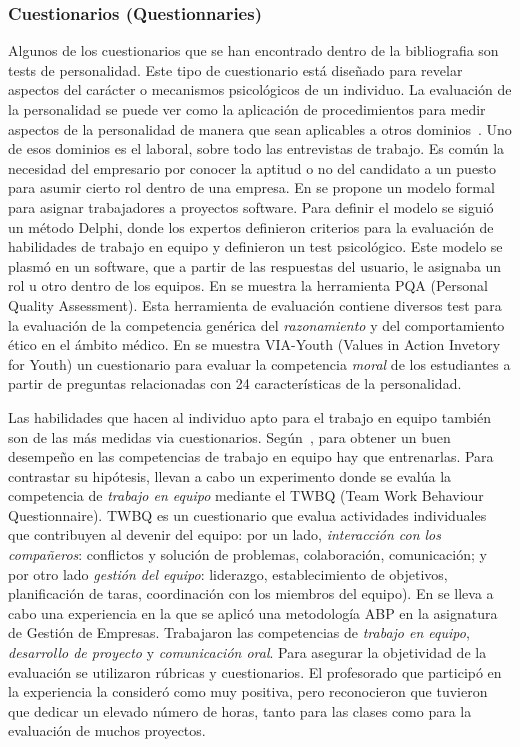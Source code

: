 \subsubsection{Cuestionarios (Questionnaries)}

Algunos de los cuestionarios que se han encontrado dentro de la bibliografia son tests de personalidad. Este tipo de cuestionario está diseñado para revelar aspectos del carácter o mecanismos psicológicos de un individuo. La evaluación de la personalidad se puede ver como la aplicación de procedimientos para medir aspectos de la personalidad de manera que sean aplicables a otros dominios~\cite{wiggins2003paradigms}. Uno de esos dominios es el laboral, sobre todo las entrevistas de trabajo. Es común la necesidad del empresario por conocer la aptitud o no del candidato a un puesto para asumir cierto rol dentro de una empresa. En \cite{andre2011formal} se propone un modelo formal para asignar trabajadores a proyectos software. Para definir el modelo se siguió un método Delphi, donde los expertos definieron criterios para la evaluación de habilidades de trabajo en equipo y definieron un test psicológico. Este modelo se plasmó en un software, que a partir de las respuestas del usuario, le asignaba un rol u otro dentro de los equipos. En \cite{lumsden2005assessment} se muestra la herramienta PQA (Personal Quality Assessment). Esta herramienta de evaluación contiene diversos test para la evaluación de la competencia genérica del \emph{razonamiento} y del {comportamiento ético} en el ámbito médico. En \cite{park2006moral} se muestra VIA-Youth (Values in Action Invetory for Youth) un cuestionario para evaluar la competencia \emph{moral} de los estudiantes a partir de preguntas relacionadas con 24 características de la personalidad. 

Las habilidades que hacen al individuo apto para el trabajo en equipo también son de las más medidas via cuestionarios. Según~\cite{martinez2014teamwork}, para obtener un buen desempeño en las competencias de trabajo en equipo hay que entrenarlas. Para contrastar su hipótesis, llevan a cabo un experimento donde se evalúa la competencia de \emph{trabajo en equipo} mediante el TWBQ (Team Work Behaviour Questionnaire). TWBQ es un cuestionario que evalua actividades individuales que contribuyen al devenir del equipo: por un lado, \emph{interacción con los compañeros}: conflictos y solución de problemas, colaboración, comunicación; y por otro lado \emph{gestión del equipo}: liderazgo, establecimiento de objetivos, planificación de taras, coordinación con los miembros del equipo). En \cite{barbera2011design} se lleva a cabo una experiencia en la que se aplicó una metodología ABP en la asignatura de Gestión de Empresas. Trabajaron las competencias de \emph{trabajo en equipo}, \emph{desarrollo de proyecto} y \emph{comunicación oral}. Para asegurar la objetividad de la evaluación se utilizaron rúbricas y cuestionarios. El profesorado que participó en la experiencia la consideró como muy positiva, pero reconocieron que tuvieron que dedicar un elevado número de horas, tanto para las clases como para la evaluación de muchos proyectos.

